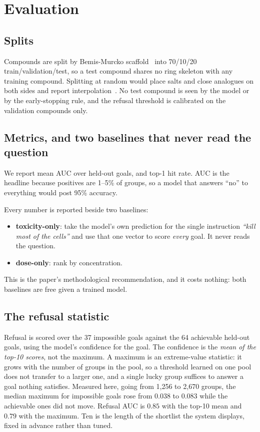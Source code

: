 \documentclass[11pt]{article}
\newcommand{\goal}[1]{\textit{``#1''}}
\begin{document}
\section{Evaluation}

\subsection{Splits}

Compounds are split by Bemis-Murcko scaffold~\citep{bemis1996scaffold} into 70/10/20
train/validation/test, so a test compound shares no ring skeleton with any training
compound. Splitting at random would place salts and close analogues on both sides and
report interpolation~\citep{wallach2018memorization}. No test compound is seen by the
model or by the early-stopping rule, and the refusal threshold is calibrated on the
validation compounds only.

\subsection{Metrics, and two baselines that never read the question}

We report mean AUC over held-out goals, and top-1 hit rate. AUC is the headline because
positives are 1--5\% of groups, so a model that answers ``no'' to everything would post
95\% accuracy.

Every number is reported beside two baselines:

\begin{itemize}\itemsep0.2em
\item \textbf{toxicity-only}: take the model's own prediction for the single instruction
\goal{kill most of the cells} and use that one vector to score \emph{every} goal. It
never reads the question.
\item \textbf{dose-only}: rank by concentration.
\end{itemize}

This is the paper's methodological recommendation, and it costs nothing: both baselines
are free given a trained model.

\subsection{The refusal statistic}

Refusal is scored over the 37 impossible goals against the 64 achievable held-out goals,
using the model's confidence for the goal. The confidence is the \emph{mean of the
top-10 scores}, not the maximum. A maximum is an extreme-value statistic: it grows with
the number of groups in the pool, so a threshold learned on one pool does not transfer
to a larger one, and a single lucky group suffices to answer a goal nothing satisfies.
Measured here, going from 1{,}256 to 2{,}670 groups, the median maximum for impossible
goals rose from $0.038$ to $0.083$ while the achievable ones did not move. Refusal AUC
is $0.85$ with the top-10 mean and $0.79$ with the maximum. Ten is the length of the
shortlist the system displays, fixed in advance rather than tuned.
\end{document}
